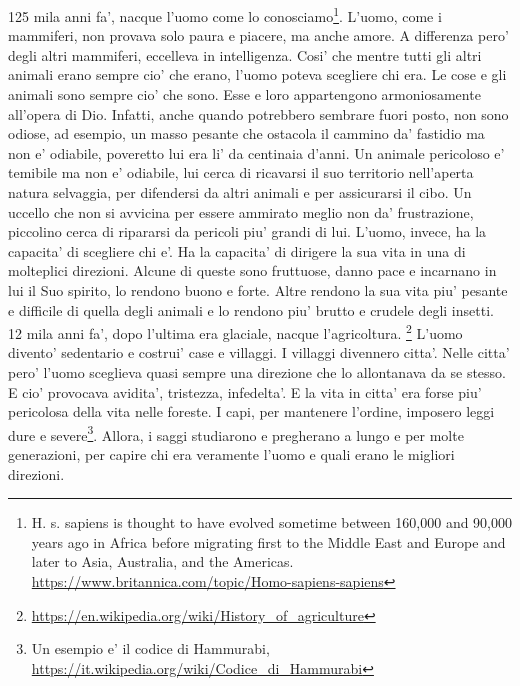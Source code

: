 {125 mila anni fa', nacque l'uomo come lo conosciamo\footnote{H. s. sapiens is thought to have evolved sometime between 160,000 and 90,000 years ago in Africa before migrating first to the Middle East and Europe and later to Asia, Australia, and the Americas. \url{https://www.britannica.com/topic/Homo-sapiens-sapiens}}. L'uomo, come i mammiferi, non provava solo paura e piacere, ma anche amore. A differenza pero' degli altri mammiferi, eccelleva in intelligenza. Cosi' che mentre tutti gli altri animali erano sempre cio' che erano, l'uomo poteva scegliere chi era. Le cose e gli animali sono sempre cio' che sono. Esse e loro appartengono armoniosamente  all'opera di Dio. Infatti, anche quando potrebbero sembrare fuori posto, non sono odiose, ad esempio, un masso pesante che ostacola il cammino da' fastidio ma non e' odiabile, poveretto lui era li' da centinaia d'anni. Un animale pericoloso e' temibile ma non e' odiabile, lui cerca di ricavarsi il suo territorio nell'aperta natura selvaggia, per difendersi da altri animali e per assicurarsi il cibo. Un uccello che non si avvicina per essere ammirato meglio non da' frustrazione, piccolino cerca di ripararsi da pericoli piu' grandi di lui.
  L'uomo, invece, ha la capacita' di scegliere chi e'. Ha la capacita' di dirigere la sua vita in una di molteplici direzioni. Alcune di queste sono fruttuose, danno pace e incarnano in lui il Suo spirito, lo rendono buono e forte. Altre rendono la sua vita piu' pesante e difficile di quella degli animali e lo rendono piu' brutto e crudele degli insetti.
  12 mila anni fa', dopo l'ultima era glaciale, nacque l'agricoltura. \footnote{\url{https://en.wikipedia.org/wiki/History\_of\_agriculture}} L'uomo divento' sedentario e costrui' case e villaggi. I villaggi divennero citta'. Nelle citta' pero' l'uomo sceglieva quasi sempre una direzione che lo allontanava da se stesso. E cio' provocava avidita', tristezza, infedelta'. E la vita in citta' era forse piu' pericolosa della vita nelle foreste.
  I capi, per mantenere l'ordine, imposero leggi dure e severe\footnote{Un esempio e' il codice di Hammurabi, \url{https://it.wikipedia.org/wiki/Codice\_di\_Hammurabi}}. Allora, i saggi studiarono e pregherano a lungo e per molte generazioni, per capire chi era veramente l'uomo e quali erano le migliori direzioni. 
}
